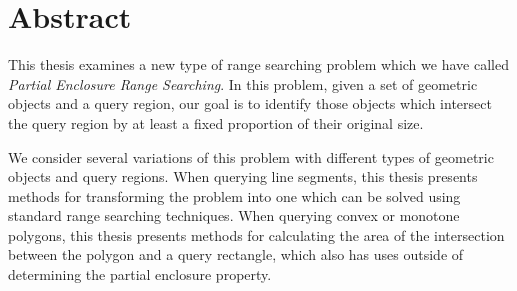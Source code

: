 \chapter*{Abstract}

This thesis examines a new type of range searching problem which we have called \emph{Partial Enclosure Range Searching}. 
In this problem, given a set of geometric objects and a query region, our goal is to identify those objects which intersect the query region by at least a fixed proportion of their original size.

We consider several variations of this problem with different types of geometric objects and query regions. 
When querying line segments, this thesis presents methods for transforming the problem into one which can be solved using standard range searching techniques.
When querying convex or monotone polygons, this thesis presents methods for calculating the area of the intersection between the polygon and a query rectangle, which also has uses outside of determining the partial enclosure property.

